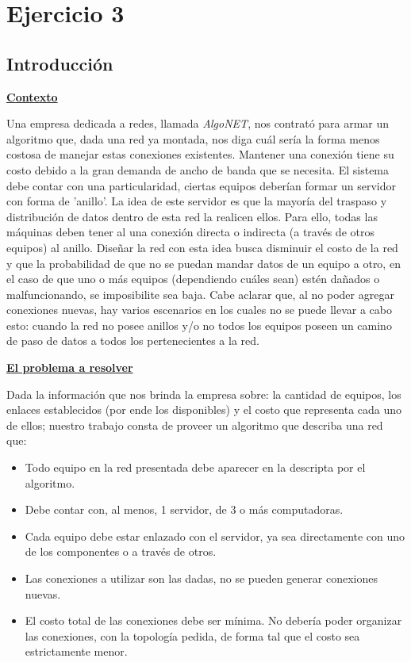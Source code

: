 \documentclass[10pt,a4paper]{article}
\begin{document}
\section{Ejercicio 3}
\subsection{Introducción}

\noindent \textbf{\underline{Contexto}}

Una empresa dedicada a redes, llamada \textit{AlgoNET}, nos contrató para armar un algoritmo que, dada una red ya montada, nos diga cuál sería la forma menos costosa de manejar estas conexiones existentes. Mantener una conexión tiene su costo debido a la gran demanda de ancho de banda que se necesita. El sistema debe contar con una particularidad, ciertas equipos deberían formar un servidor con forma de 'anillo'. La idea de este servidor es que la mayoría del traspaso y distribución de datos dentro de esta red la realicen ellos. Para ello, todas las máquinas deben tener al una conexión directa o indirecta (a través de otros equipos) al anillo. Diseñar la red con esta idea busca disminuir el costo de la red y que la probabilidad de que no se puedan mandar datos de un equipo a otro, en el caso de que uno o más equipos (dependiendo cuáles sean) estén dañados o malfuncionando, se imposibilite sea baja. Cabe aclarar que, al no poder agregar conexiones nuevas, hay varios escenarios en los cuales no se puede llevar a cabo esto: cuando la red no posee anillos y/o no todos los equipos poseen un camino de paso de datos a todos los pertenecientes a la red.

\noindent \textbf{\underline{El problema a resolver}}

Dada la información que nos brinda la empresa sobre: la cantidad de equipos, los enlaces establecidos (por ende los disponibles) y el costo que representa cada uno de ellos; nuestro trabajo consta de proveer un algoritmo que describa una red que:

\begin{itemize}
\item Todo equipo en la red presentada debe aparecer en la descripta por el algoritmo.
\item Debe contar con, al menos, 1 servidor, de 3 o más computadoras.
\item Cada equipo debe estar enlazado con el servidor, ya sea directamente con uno de los componentes o a través de otros.
\item Las conexiones a utilizar son las dadas, no se pueden generar conexiones nuevas.
\item El costo total de las conexiones debe ser mínima. No debería poder organizar las conexiones, con la topología pedida, de forma tal que el costo sea estrictamente menor.
\end{itemize}
\end{document}
